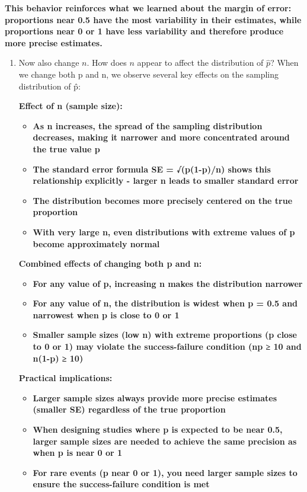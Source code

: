 \documentclass[
]{article}
\providecommand{\tightlist}{%
  \setlength{\itemsep}{0pt}\setlength{\parskip}{0pt}}
\begin{document}
\textbf{This behavior reinforces what we learned about the margin of
error: proportions near 0.5 have the most variability in their
estimates, while proportions near 0 or 1 have less variability and
therefore produce more precise estimates.}

\begin{enumerate}
\def\labelenumi{\arabic{enumi}.}
\setcounter{enumi}{7}
\item
  Now also change \(n\). How does \(n\) appear to affect the
  distribution of \(\hat{p}\)? When we change both p and n, we observe
  several key effects on the sampling distribution of p̂:

  \textbf{Effect of n (sample size):}

  \begin{itemize}
  \tightlist
  \item
    \textbf{As n increases, the spread of the sampling distribution
    decreases, making it narrower and more concentrated around the true
    value p}
  \item
    \textbf{The standard error formula SE = √(p(1-p)/n) shows this
    relationship explicitly - larger n leads to smaller standard error}
  \item
    \textbf{The distribution becomes more precisely centered on the true
    proportion}
  \item
    \textbf{With very large n, even distributions with extreme values of
    p become approximately normal}
  \end{itemize}

  \textbf{Combined effects of changing both p and n:}

  \begin{itemize}
  \tightlist
  \item
    \textbf{For any value of p, increasing n makes the distribution
    narrower}
  \item
    \textbf{For any value of n, the distribution is widest when p = 0.5
    and narrowest when p is close to 0 or 1}
  \item
    \textbf{Smaller sample sizes (low n) with extreme proportions (p
    close to 0 or 1) may violate the success-failure condition (np ≥ 10
    and n(1-p) ≥ 10)}
  \end{itemize}

  \textbf{Practical implications:}

  \begin{itemize}
  \tightlist
  \item
    \textbf{Larger sample sizes always provide more precise estimates
    (smaller SE) regardless of the true proportion}
  \item
    \textbf{When designing studies where p is expected to be near 0.5,
    larger sample sizes are needed to achieve the same precision as when
    p is near 0 or 1}
  \item
    \textbf{For rare events (p near 0 or 1), you need larger sample
    sizes to ensure the success-failure condition is met}
  \end{itemize}
\end{enumerate}
\end{document}
